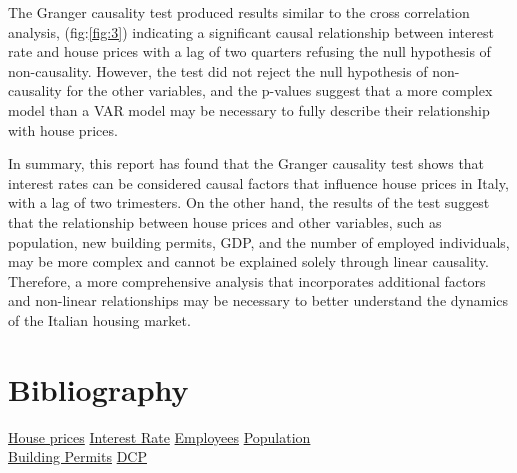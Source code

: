\documentclass[a4paper,11pt,rmp,superscriptaddress]{report}
\begin{document}
The Granger causality test produced results similar to the cross correlation analysis, (fig:\ref*{fig:3}) indicating a significant causal relationship 
between interest rate and house prices with a lag of two quarters refusing the null hypothesis of non-causality. 
However, the test did not reject the null hypothesis of non-causality for the other variables, 
and the p-values suggest that a more complex model than a VAR model may be necessary to fully describe their 
relationship with house prices.

In summary, this report has found that the Granger causality 
test shows that interest rates can be considered causal factors that influence house prices in Italy, with a lag of two trimesters. 
On the other hand, the results of the test suggest that the relationship between house prices and other variables, 
such as population, new building permits, GDP, and the number of employed individuals, 
may be more complex and cannot be explained solely through linear causality. Therefore, a more comprehensive analysis that 
incorporates additional factors and non-linear relationships may be necessary to better understand the dynamics of the Italian 
housing market.
\section*{Bibliography}
\label{section:Bibliography}
    \href{https://fred.stlouisfed.org/series/QITR628BIS}{House prices}
    \href{https://infostat.bancaditalia.it/inquiry/home?spyglass/taxo:CUBESET=/PRINC_IND_00/PRINC_IND_01/PRINC_IND_02/PRINC_IND_02_02&ITEMSELEZ=BAM_MIR.M.1300010.MIR5411.9.950.1000.SBI17.EUR.110.212:true&OPEN=false/&ep:LC=IT&COMM=BANKITALIA&ENV=LIVE&CTX=DIFF&IDX=1&/view:CUBEIDS=BAM_MIR.M.1300010.MIR5411.9.950.1000.SBI17.EUR.110.212} {Interest Rate} 
    \href{http://dati.istat.it/#}{Employees} 
    \href{https://ourworldindata.org/grapher/population}{Population} \\
    \href{http://dati.istat.it/#}{Building Permits} 
    \href{http://dati.istat.it/Index.aspx?DataSetCode=DCCN_PILT}{DCP}
\end{document}
